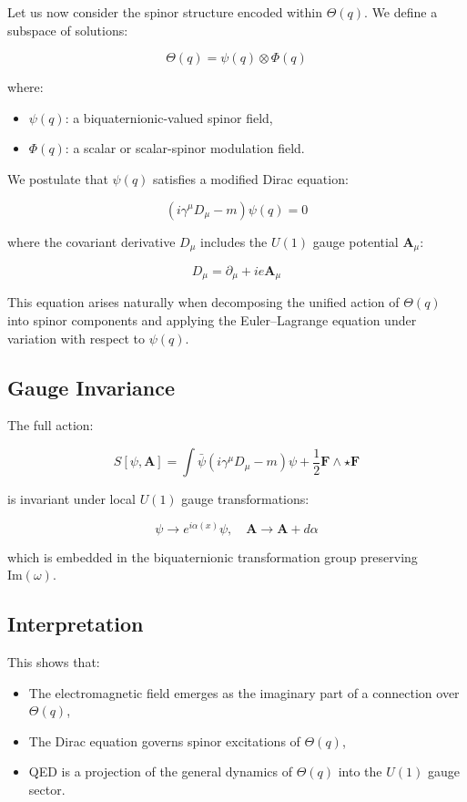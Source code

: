 Let us now consider the spinor structure encoded within \(\Theta(q)\). We define a subspace of solutions:

\[
\Theta(q) = \psi(q) \otimes \Phi(q)
\]

where:
\begin{itemize}
  \item \(\psi(q)\): a biquaternionic-valued spinor field,
  \item \(\Phi(q)\): a scalar or scalar-spinor modulation field.
\end{itemize}

We postulate that \(\psi(q)\) satisfies a modified Dirac equation:

\[
(i\gamma^\mu D_\mu - m)\psi(q) = 0
\]

where the covariant derivative \(D_\mu\) includes the \(U(1)\) gauge potential \(\mathbf{A}_\mu\):

\[
D_\mu = \partial_\mu + i e \mathbf{A}_\mu
\]

This equation arises naturally when decomposing the unified action of \(\Theta(q)\) into spinor components
and applying the Euler–Lagrange equation under variation with respect to \(\psi(q)\).

\subsection*{Gauge Invariance}

The full action:

\[
S[\psi, \mathbf{A}] = \int \bar{\psi}(i\gamma^\mu D_\mu - m)\psi + \frac{1}{2} \mathbf{F} \wedge \star \mathbf{F}
\]

is invariant under local \(U(1)\) gauge transformations:

\[
\psi \rightarrow e^{i\alpha(x)} \psi, \quad \mathbf{A} \rightarrow \mathbf{A} + d\alpha
\]

which is embedded in the biquaternionic transformation group preserving \(\text{Im}(\omega)\).

\subsection*{Interpretation}

This shows that:

\begin{itemize}
  \item The electromagnetic field emerges as the imaginary part of a connection over \(\Theta(q)\),
  \item The Dirac equation governs spinor excitations of \(\Theta(q)\),
  \item QED is a projection of the general dynamics of \(\Theta(q)\) into the \(U(1)\) gauge sector.
\end{itemize}

